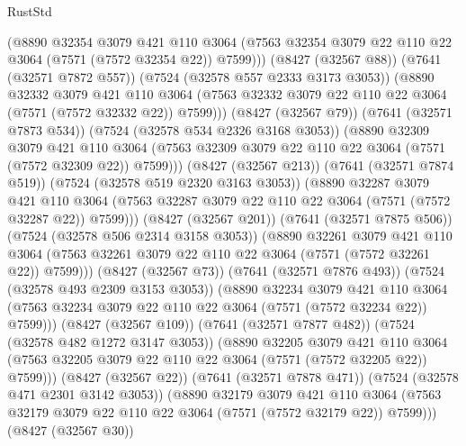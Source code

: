 \begin{lexlean}{RustStd}
\begin{coremodule}
                    (@8890
                      @32354
                      @3079
                      @421
                      @110
                      @3064
                      (@7563 @32354 @3079 @22 @110 @22 @3064 (@7571 (@7572 @32354 @22)) @7599)))
                  (@8427 (@32567 @88))
                  (@7641 (@32571 @7872 @557))
                  (@7524 (@32578 @557 @2333 @3173 @3053))
                  (@8890
                    @32332
                    @3079
                    @421
                    @110
                    @3064
                    (@7563 @32332 @3079 @22 @110 @22 @3064 (@7571 (@7572 @32332 @22)) @7599)))
                (@8427 (@32567 @79))
                (@7641 (@32571 @7873 @534))
                (@7524 (@32578 @534 @2326 @3168 @3053))
                (@8890
                  @32309
                  @3079
                  @421
                  @110
                  @3064
                  (@7563 @32309 @3079 @22 @110 @22 @3064 (@7571 (@7572 @32309 @22)) @7599)))
              (@8427 (@32567 @213))
              (@7641 (@32571 @7874 @519))
              (@7524 (@32578 @519 @2320 @3163 @3053))
              (@8890
                @32287
                @3079
                @421
                @110
                @3064
                (@7563 @32287 @3079 @22 @110 @22 @3064 (@7571 (@7572 @32287 @22)) @7599)))
            (@8427 (@32567 @201))
            (@7641 (@32571 @7875 @506))
            (@7524 (@32578 @506 @2314 @3158 @3053))
            (@8890
              @32261
              @3079
              @421
              @110
              @3064
              (@7563 @32261 @3079 @22 @110 @22 @3064 (@7571 (@7572 @32261 @22)) @7599)))
          (@8427 (@32567 @73))
          (@7641 (@32571 @7876 @493))
          (@7524 (@32578 @493 @2309 @3153 @3053))
          (@8890
            @32234
            @3079
            @421
            @110
            @3064
            (@7563 @32234 @3079 @22 @110 @22 @3064 (@7571 (@7572 @32234 @22)) @7599)))
        (@8427 (@32567 @109))
        (@7641 (@32571 @7877 @482))
        (@7524 (@32578 @482 @1272 @3147 @3053))
        (@8890
          @32205
          @3079
          @421
          @110
          @3064
          (@7563 @32205 @3079 @22 @110 @22 @3064 (@7571 (@7572 @32205 @22)) @7599)))
      (@8427 (@32567 @22))
      (@7641 (@32571 @7878 @471))
      (@7524 (@32578 @471 @2301 @3142 @3053))
      (@8890
        @32179
        @3079
        @421
        @110
        @3064
        (@7563 @32179 @3079 @22 @110 @22 @3064 (@7571 (@7572 @32179 @22)) @7599)))
    (@8427 (@32567 @30))

\end{coremodule}
\end{lexlean}
